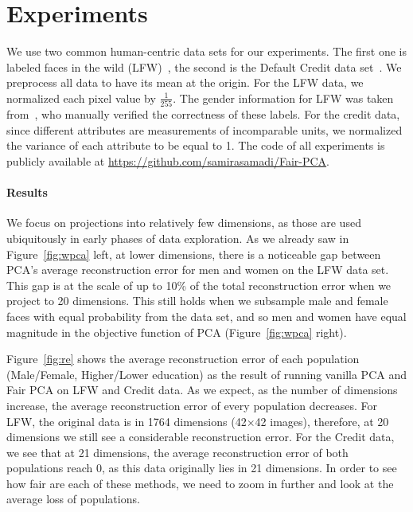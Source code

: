 \documentclass{article}
\begin{document}
\section{Experiments}

We use two common human-centric data sets for our experiments.  The
first one is labeled faces in the wild (LFW)~\citep{LFWTech}, the
second is the Default Credit data set~\citep{default-dataset}. We preprocess all data to have its mean at the origin. For the LFW
data, we normalized each pixel value by $\tfrac{1}{255}$.  The gender
information for LFW was taken from~\citet{afifi2017afif4}, who
manually verified the correctness of these labels. For the credit data, since different attributes are measurements of
incomparable units, we normalized the variance of each attribute to be
equal to 1. The code of all experiments is publicly available at \url{https://github.com/samirasamadi/Fair-PCA}.


\paragraph{Results}

We focus on projections into relatively few dimensions,
as those are used ubiquitously in early phases of data exploration. 
As we already saw in Figure~\ref{fig:wpca} left, at lower dimensions,
there is a noticeable gap between PCA's average reconstruction error for men and women on the LFW data set. This gap is at the
scale of up to 10\% of the total reconstruction error when we project to 20 dimensions. This still holds when we subsample male and female
faces with equal probability from the data set, and so men and women
have equal magnitude in the objective function of PCA (Figure~\ref{fig:wpca} right). 

Figure~\ref{fig:re} shows the average reconstruction error of each population (Male/Female, Higher/Lower education) as the result of running vanilla PCA and Fair PCA on LFW and Credit data. 
As we expect, as the number of dimensions increase, the average reconstruction error of every population decreases. For LFW, the original data is in 1764 dimensions (42$\times$42 images), therefore, at 20 dimensions we still see a considerable reconstruction error. For the Credit data, we see that at 21 dimensions, the average reconstruction error of both populations reach 0, as this data originally lies in 21 dimensions. In order to see how fair are each of these methods, we need to zoom in further and look at the average loss of populations.  
\end{document}
